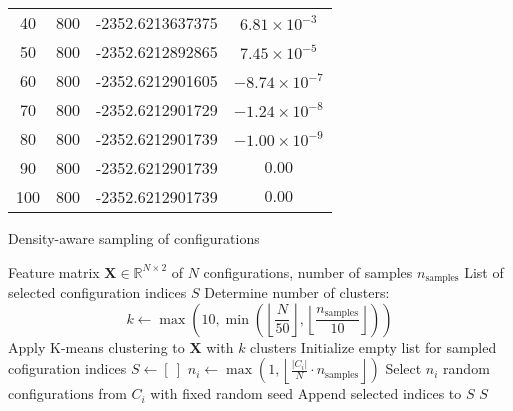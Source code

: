 \begin{table}[htbp]
\begin{tabular}{cccc}
    40 & 800 &  -2352.6213637375 & $6.81 \times 10^{-3}$ \\
    50 & 800 &  -2352.6212892865 & $7.45 \times 10^{-5}$ \\
    60 & 800 &  -2352.6212901605 & $-8.74 \times 10^{-7}$ \\
    70 & 800 &  -2352.6212901729 & $-1.24 \times 10^{-8}$ \\
    80 & 800 &  -2352.6212901739 & $-1.00 \times 10^{-9}$ \\
    90 & 800 &  -2352.6212901739 & $0.00$ \\
    100 & 800 &  -2352.6212901739 & $0.00$ \\
    \bottomrule
    \end{tabular}
\end{table}


\renewcommand{\algorithmicrequire}{\textbf{Input:}}
\renewcommand{\algorithmicensure}{\textbf{Output:}}
\begin{algorithm}[htbp]
    \caption{Density-aware sampling of configurations}
    \label{alg:density_aware_sampling}
    \begin{algorithmic}[1]
    \Require Feature matrix $\mathbf{X} \in \mathbb{R}^{N \times 2}$ of $N$ configurations, number of samples $n_\text{samples}$
    \Ensure List of selected configuration indices $S$
    \State Determine number of clusters:
        \[
        k \gets \max\left(10, \min\left(\left\lfloor \frac{N}{50} \right\rfloor, \left\lfloor \frac{n_\text{samples}}{10} \right\rfloor\right)\right)
        \]
    \State Apply K-means clustering to $\mathbf{X}$ with $k$ clusters
    \State Initialize empty list for sampled cofiguration indices $S \gets [\ ]$
        \State $n_i \gets \max\left(1, \left\lfloor \frac{|C_i|}{N} \cdot n_\text{samples} \right\rfloor \right)$
        \State Select $n_i$ random configurations from $C_i$ with fixed random seed
        \State Append selected indices to $S$
    \EndFor
    \State \Return $S$
    \end{algorithmic}
\end{algorithm}



